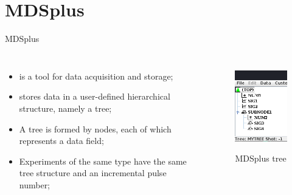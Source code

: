 
\section{MDSplus}
\graphicspath{{figs/section6/}}

\begin{frame}{MDSplus}
	\begin{columns}
		\begin{itemize}
			\item {} is a tool for data acquisition and storage;
			\item {} stores data in a user-defined hierarchical structure, namely a tree;
			\item A tree is formed by nodes, each of which represents a data field;
			\item Experiments of the same type have the same tree structure and an incremental pulse number;
		\end{itemize}
		\begin{figure}
			\centering
			\includegraphics[scale=.5]{tree.png}
			\label{fig:tree}
			\caption{MDSplus tree}
		\end{figure}
	\end{columns}
\end{frame}
